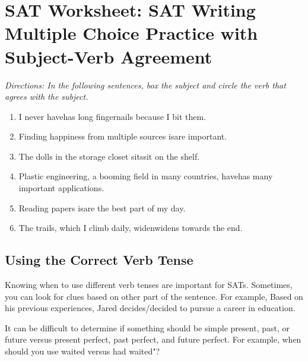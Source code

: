 \section{SAT Worksheet: SAT Writing Multiple Choice Practice with Subject-Verb Agreement}

\textit{Directions: In the following sentences, box the subject and circle the verb that agrees with the subject.}

\begin{enumerate}
\item{I never have\/has long fingernails because I bit them.}


\item{Finding happiness from multiple sources is\/are important.}


\item{The dolls in the storage closet sits\/sit on the shelf.}


\item{Plastic engineering, a booming field in many countries, have\/has many important applications.}


\item{Reading papers is\/are the best part of my day.}


\item{The trails, which I climb daily, widen\/widens towards the end.}

\end{enumerate}

\subsection{Using the Correct Verb Tense}

Knowing when to use different verb tenses are important for SATs. Sometimes, you can look for
clues based on other part of the sentence. For example, Based on his previous experiences, Jared
decides/decided to pursue a career in education.

\bigskip
It can be difficult to determine if something should be simple present, past, or future versus present
perfect, past perfect, and future perfect. For example, when should you use \/waited versus \/had
waited"?

